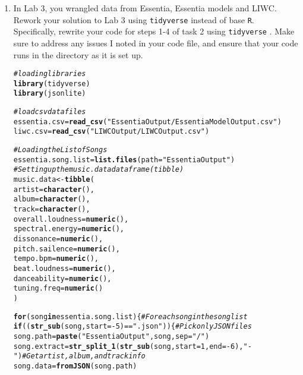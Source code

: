 \documentclass{article}\usepackage[]{graphicx}\usepackage[]{xcolor}
\makeatletter
\newcommand{\hlnum}[1]{\textcolor[rgb]{0.686,0.059,0.569}{#1}}%
\newcommand{\hlsng}[1]{\textcolor[rgb]{0.192,0.494,0.8}{#1}}%
\newcommand{\hlcom}[1]{\textcolor[rgb]{0.678,0.584,0.686}{\textit{#1}}}%
\newcommand{\hlopt}[1]{\textcolor[rgb]{0,0,0}{#1}}%
\newcommand{\hldef}[1]{\textcolor[rgb]{0.345,0.345,0.345}{#1}}%
\newcommand{\hlkwa}[1]{\textcolor[rgb]{0.161,0.373,0.58}{\textbf{#1}}}%
\newcommand{\hlkwb}[1]{\textcolor[rgb]{0.69,0.353,0.396}{#1}}%
\newcommand{\hlkwc}[1]{\textcolor[rgb]{0.333,0.667,0.333}{#1}}%
\newcommand{\hlkwd}[1]{\textcolor[rgb]{0.737,0.353,0.396}{\textbf{#1}}}%
\newenvironment{kframe}{%
 \def\at@end@of@kframe{}%
 \ifinner\ifhmode%
  \def\at@end@of@kframe{\end{minipage}}%
  \begin{minipage}{\columnwidth}%
 \fi\fi%
 \def\FrameCommand##1{\hskip\@totalleftmargin \hskip-\fboxsep
 \colorbox{shadecolor}{##1}\hskip-\fboxsep
     \hskip-\linewidth \hskip-\@totalleftmargin \hskip\columnwidth}%
 \MakeFramed {\advance\hsize-\width
   \@totalleftmargin\z@ \linewidth\hsize
   \@setminipage}}%
 {\par\unskip\endMakeFramed%
 \at@end@of@kframe}
\newenvironment{knitrout}{}{} %
\makeatother
\begin{document}
\begin{enumerate}
\item In Lab 3, you wrangled data from Essentia, Essentia models and LIWC. Rework your 
solution to Lab 3 using \texttt{tidyverse} \citep{tidyverse} instead of base \texttt{R}.
Specifically, rewrite your code for steps 1-4 of task 2 using \texttt{tidyverse} \citep{tidyverse}. 
Make sure to address any issues I noted in your code file, and ensure that your code 
runs in the directory as it is set up.
\begin{knitrout}\scriptsize
{}\color{fgcolor}\begin{kframe}
\begin{alltt}
\hlcom{#loading libraries}
\hlkwd{library}\hldef{(tidyverse)}
\hlkwd{library}\hldef{(jsonlite)}

\hlcom{#load csv data files}
\hldef{essentia.csv} \hlkwb{=} \hlkwd{read_csv}\hldef{(}\hlsng{"EssentiaOutput/EssentiaModelOutput.csv"}\hldef{)}
\hldef{liwc.csv} \hlkwb{=} \hlkwd{read_csv}\hldef{(}\hlsng{"LIWCOutput/LIWCOutput.csv"}\hldef{)}

\hlcom{#Loading the List of Songs}
\hldef{essentia.song.list} \hlkwb{=} \hlkwd{list.files}\hldef{(}\hlkwc{path} \hldef{=} \hlsng{"EssentiaOutput"}\hldef{)}
\hlcom{#Setting up the music.data dataframe(tibble)}
\hldef{music.data} \hlkwb{<-} \hlkwd{tibble}\hldef{(}
  \hlkwc{artist} \hldef{=} \hlkwd{character}\hldef{(),}
  \hlkwc{album} \hldef{=} \hlkwd{character}\hldef{(),}
  \hlkwc{track} \hldef{=} \hlkwd{character}\hldef{(),}
  \hlkwc{overall.loudness} \hldef{=} \hlkwd{numeric}\hldef{(),}
  \hlkwc{spectral.energy} \hldef{=} \hlkwd{numeric}\hldef{(),}
  \hlkwc{dissonance} \hldef{=} \hlkwd{numeric}\hldef{(),}
  \hlkwc{pitch.sailence} \hldef{=} \hlkwd{numeric}\hldef{(),}
  \hlkwc{tempo.bpm} \hldef{=} \hlkwd{numeric}\hldef{(),}
  \hlkwc{beat.loudness} \hldef{=} \hlkwd{numeric}\hldef{(),}
  \hlkwc{danceability} \hldef{=} \hlkwd{numeric}\hldef{(),}
  \hlkwc{tuning.freq} \hldef{=} \hlkwd{numeric}\hldef{()}
\hldef{)}

\hlkwa{for}\hldef{(song} \hlkwa{in} \hldef{essentia.song.list) \{} \hlcom{#For each song in the song list}
  \hlkwa{if} \hldef{((}\hlkwd{str_sub}\hldef{(song,} \hlkwc{start} \hldef{=} \hlopt{-}\hlnum{5}\hldef{)} \hlopt{==} \hlsng{".json"}\hldef{))\{} \hlcom{#Pick only JSON files}
    \hldef{song.path} \hlkwb{=} \hlkwd{paste}\hldef{(}\hlsng{"EssentiaOutput"}\hldef{, song,} \hlkwc{sep} \hldef{=} \hlsng{"/"}\hldef{)}
    \hldef{song.extract} \hlkwb{=} \hlkwd{str_split_1}\hldef{(}\hlkwd{str_sub}\hldef{(song,} \hlkwc{start} \hldef{=} \hlnum{1}\hldef{,} \hlkwc{end} \hldef{=} \hlopt{-}\hlnum{6}\hldef{),} \hlsng{"-"}\hldef{)} \hlcom{#Get artist, album, and track info}
    \hldef{song.data} \hlkwb{=} \hlkwd{fromJSON}\hldef{(song.path)}


\end{alltt}
\end{kframe}
\end{knitrout}
\end{enumerate}
\end{document}
